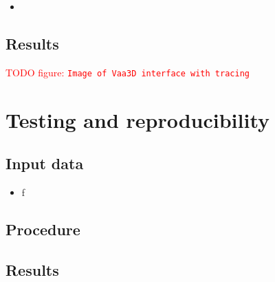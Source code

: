 \documentclass[12pt]{article}
\newcommand{\todofig}[1]{%
	\textcolor{red}{TODO figure: \nolinkurl{#1}}%
}
\begin{document}
\begin{itemize}
	\item 
\end{itemize}

\subsection{Results}

\todofig{Image of Vaa3D interface with tracing}

\section{Testing and reproducibility}

\subsection{Input data}

\begin{itemize}
	\item f
\end{itemize}

\subsection{Procedure}

\subsection{Results}
\end{document}
